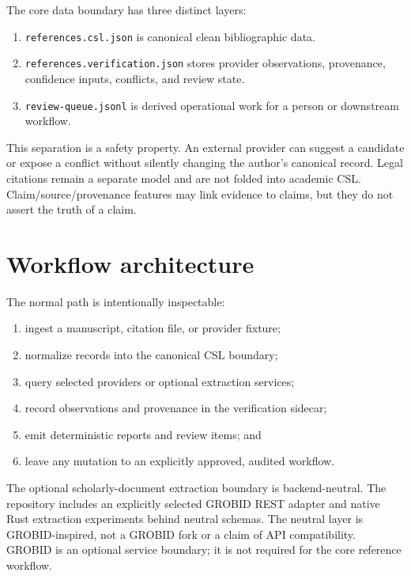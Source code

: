\documentclass[11pt]{article}
\begin{document}
The core data boundary has three distinct layers:

\begin{enumerate}
  \item \texttt{references.csl.json} is canonical clean bibliographic data.
  \item \texttt{references.verification.json} stores provider observations,
        provenance, confidence inputs, conflicts, and review state.
  \item \texttt{review-queue.jsonl} is derived operational work for a person
        or downstream workflow.
\end{enumerate}

This separation is a safety property. An external provider can suggest a
candidate or expose a conflict without silently changing the author's
canonical record. Legal citations remain a separate model and are not folded
into academic CSL. Claim/source/provenance features may link evidence to
claims, but they do not assert the truth of a claim.

\section{Workflow architecture}

The normal path is intentionally inspectable:

\begin{enumerate}
  \item ingest a manuscript, citation file, or provider fixture;
  \item normalize records into the canonical CSL boundary;
  \item query selected providers or optional extraction services;
  \item record observations and provenance in the verification sidecar;
  \item emit deterministic reports and review items; and
  \item leave any mutation to an explicitly approved, audited workflow.
\end{enumerate}

The optional scholarly-document extraction boundary is backend-neutral. The
repository includes an explicitly selected GROBID REST adapter and native
Rust extraction experiments behind neutral schemas. The neutral layer is
GROBID-inspired, not a GROBID fork or a claim of API compatibility. GROBID is
an optional service boundary; it is not required for the core reference
workflow.
\end{document}
